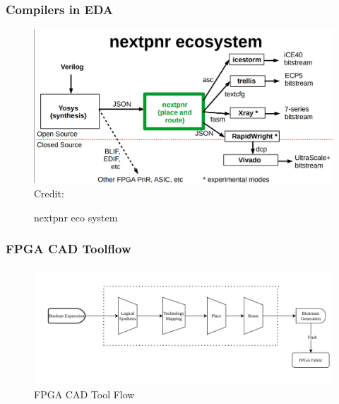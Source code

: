 \documentclass{beamer}
\begin{document}
\begin{frame}[fragile]
   \frametitle{Compilers in EDA}
     \begin{figure}
         \centering
	 \includegraphics[width=1\linewidth]{images/nextpnr_ecosystem.png}
	 \hspace*{1pt}\hbox{\scriptsize Credit:}
	 \caption{nextpnr eco system}
	 \label{exa_nextpnr}
     \end{figure}
\end{frame}

\begin{frame}[fragile]
  \frametitle{FPGA CAD Toolflow}
  \framesubtitle{}
   \begin{figure}
        \centering
        \includegraphics[width=1\linewidth]{images/cad_flow.png}
        \caption{FPGA CAD Tool Flow}
        \label{exa_cadflow}
    \end{figure}
   
\end{frame}
\end{document}
